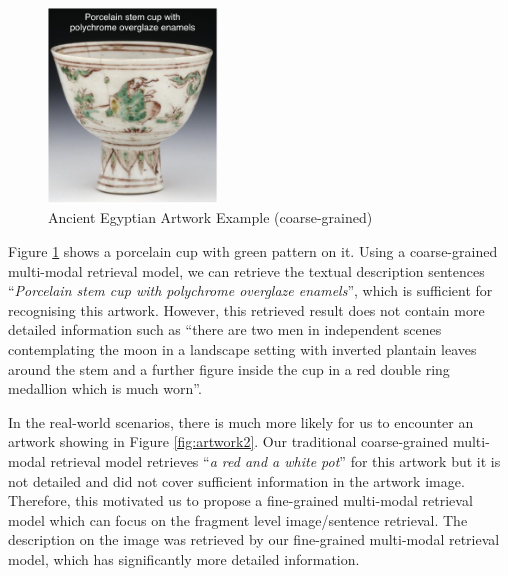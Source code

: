\begin{figure}[h!]
\centering
\includegraphics[width=0.4\textwidth]{artwork_fine1.pdf}
\caption{Ancient Egyptian Artwork Example (coarse-grained)}
\label{fig:artwork1}
\end{figure}

Figure \ref{fig:artwork1} shows a porcelain cup with green pattern on it. Using a coarse-grained multi-modal retrieval model, we can retrieve the textual description sentences ``\textit{Porcelain stem cup with polychrome overglaze enamels}'', which is sufficient for recognising this artwork. However, this retrieved result does not contain more detailed information such as ``there are two men in independent scenes contemplating the moon in a landscape setting with inverted plantain leaves around the stem and a further figure inside the cup in a red double ring medallion which is much worn''. 

In the real-world scenarios, there is much more likely for us to encounter an artwork showing in Figure \ref{fig:artwork2}. Our traditional coarse-grained multi-modal retrieval model retrieves ``\textit{a red and a white pot}'' for this artwork but it is not detailed and did not cover sufficient information in the artwork image. Therefore, this motivated us to propose a fine-grained multi-modal retrieval model which can focus on the fragment level image/sentence retrieval. The description on the image was retrieved by our fine-grained multi-modal retrieval model, which has significantly more detailed information.

